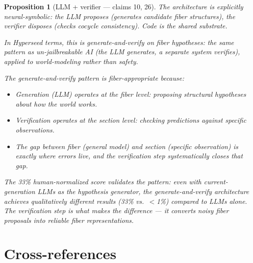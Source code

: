 \documentclass[11pt,a4paper]{article}
\newtheorem{proposition}[definition]{Proposition}
\begin{document}
\begin{proposition}[LLM + verifier --- claims 10, 26]
\label{prop:genverify}
The architecture is explicitly neural-symbolic: the LLM proposes
(generates candidate fiber structures), the verifier disposes
(checks cocycle consistency). Code is the shared substrate.

In Hyperseed terms, this is \emph{generate-and-verify on fiber
hypotheses}: the same pattern as un-jailbreakable AI (the LLM
generates, a separate system verifies), applied to world-modeling
rather than safety.

The generate-and-verify pattern is fiber-appropriate because:
\begin{itemize}
\item Generation (LLM) operates at the fiber level: proposing
  structural hypotheses about how the world works.
\item Verification operates at the section level: checking
  predictions against specific observations.
\item The gap between fiber (general model) and section (specific
  observation) is exactly where errors live, and the verification
  step systematically closes that gap.
\end{itemize}

The 33\% human-normalized score validates the pattern: even with
current-generation LLMs as the hypothesis generator, the
generate-and-verify architecture achieves qualitatively different
results (33\% vs.\ $<$1\%) compared to LLMs alone. The verification
step is what makes the difference --- it converts noisy fiber
proposals into reliable fiber representations.
\end{proposition}

\section{Cross-references}
\end{document}
